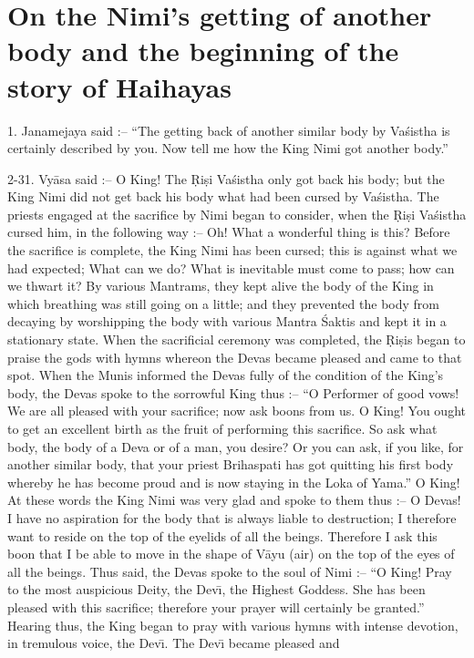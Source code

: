 \chapter{On the Nimi's getting of another body and the beginning of the story of Haihayas}

1. Janamejaya said :-- ``The getting back of another similar body by Va\'sistha is certainly described by you. Now tell me how the King Nimi got another body.''

2-31. Vy\=asa said :-- O King! The \d{R}i\d{s}i Va\'sistha only got back his body; but the King Nimi did not get back his body what had been cursed by Va\'sistha. The priests engaged at the sacrifice by Nimi began to consider, when the \d{R}i\d{s}i Va\'sistha cursed him, in the following way :-- Oh! What a wonderful thing is this? Before the sacrifice is complete, the King Nimi has been cursed; this is against what we had expected; What can we do? What is inevitable must come to pass; how can we thwart it? By various Mantrams, they kept alive the body of the King in which breathing was still going on a little; and they prevented the body from decaying by worshipping the body with various Mantra \'Saktis and kept it in a stationary state. When the sacrificial ceremony was completed, the \d{R}i\d{s}is began to praise the gods with hymns whereon the Devas became pleased and came to that spot. When the Munis informed the Devas fully of the condition of the King's body, the Devas spoke to the sorrowful King thus :-- ``O Performer of good vows! We are all pleased with your sacrifice; now ask boons from us. O King! You ought to get an excellent birth as the fruit of performing this sacrifice. So ask what body, the body of a Deva or of a man, you desire? Or you can ask, if you like, for another similar body, that your priest Brihaspati has got quitting his first body whereby he has become proud and is now staying in the Loka of Yama.'' O King! At these words the King Nimi was very glad and spoke to them thus :-- O Devas! I have no aspiration for the body that is always liable to destruction; I therefore want to reside on the top of the eyelids of all the beings. Therefore I ask this boon that I be able to move in the shape of V\=ayu (air) on the top of the eyes of all the beings. Thus said, the Devas spoke to the soul of Nimi :-- ``O King! Pray to the most auspicious Deity, the Dev\={\i}, the Highest Goddess. She has been pleased with this sacrifice; therefore your prayer will certainly be granted.'' Hearing thus, the King began to pray with various hymns with intense devotion, in tremulous voice, the Dev\={\i}. The Dev\={\i} became pleased and

